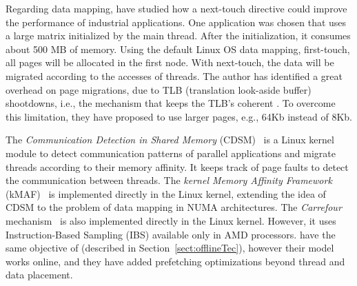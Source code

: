 Regarding data mapping,  have studied how a next-touch directive could improve the performance of industrial applications. 
One application was chosen that uses a large matrix initialized by the main thread. After the initialization, it consumes about 500 MB of memory. Using the default Linux OS data mapping, first-touch, all pages will be allocated in the first node. With next-touch, the data will be migrated according to the accesses of threads. The author has identified a great overhead on page migrations, due to TLB (translation look-aside buffer) shootdowns, i.e., the mechanism that keeps the TLB's coherent \cite{Villavieja:2011}. To overcome this limitation, they have proposed to use larger pages, e.g., 64Kb instead of 8Kb.

The \emph{Communication Detection in Shared Memory} (CDSM)~\cite{cdsm} is a Linux kernel module to detect communication patterns of parallel applications and migrate threads according to their memory affinity. It keeps track of page faults to detect the communication between threads. The \emph{kernel Memory Affinity Framework} (kMAF)~\cite{kmaf} is implemented directly in the Linux kernel, extending the idea of CDSM to the problem of data mapping in NUMA architectures. The \emph{Carrefour} mechanism~\cite{Dashti:2013} is also implemented directly in the Linux kernel. However, it uses Instruction-Based Sampling (IBS) available only in AMD processors.  have the same objective of  (described in Section~\ref{sect:offlineTec}), however their model works online, and they have added prefetching optimizations beyond thread and data placement.



